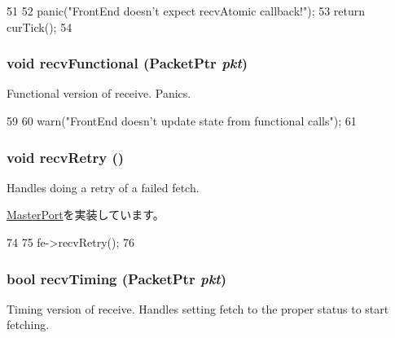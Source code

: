 \begin{DoxyCode}
51 {
52     panic("FrontEnd doesn't expect recvAtomic callback!");
53     return curTick();
54 }
\end{DoxyCode}
\hypertarget{classFrontEnd_1_1IcachePort_aeefa907fb6d6a787e6dab90e8138ea90}{
\subsubsection[{recvFunctional}]{\setlength{\rightskip}{0pt plus 5cm}void recvFunctional ({\bf PacketPtr} {\em pkt})}}
\label{classFrontEnd_1_1IcachePort_aeefa907fb6d6a787e6dab90e8138ea90}
Functional version of receive. Panics. 


\begin{DoxyCode}
59 {
60     warn("FrontEnd doesn't update state from functional calls");
61 }
\end{DoxyCode}
\hypertarget{classFrontEnd_1_1IcachePort_a29cb5a4f98063ce6e9210eacbdb35298}{
\subsubsection[{recvRetry}]{\setlength{\rightskip}{0pt plus 5cm}void recvRetry ()}}
\label{classFrontEnd_1_1IcachePort_a29cb5a4f98063ce6e9210eacbdb35298}
Handles doing a retry of a failed fetch. 

\hyperlink{classMasterPort_ac1ccc3bcf7ebabb20b57fab99b2be5b0}{MasterPort}を実装しています。


\begin{DoxyCode}
74 {
75     fe->recvRetry();
76 }
\end{DoxyCode}
\hypertarget{classFrontEnd_1_1IcachePort_aaeef0f6f81d00988bb7b8ba8fe56049e}{
\subsubsection[{recvTiming}]{\setlength{\rightskip}{0pt plus 5cm}bool recvTiming ({\bf PacketPtr} {\em pkt})}}
\label{classFrontEnd_1_1IcachePort_aaeef0f6f81d00988bb7b8ba8fe56049e}
Timing version of receive. Handles setting fetch to the proper status to start fetching. 



